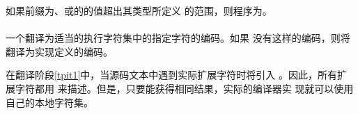 \begin{note} %
  如果前缀为、或的的值超出其类型所定义
  的范围，则程序为\illform{}。
\end{note}

\paragraph{} %
一个翻译为适当的执行字符集中的指定字符的编码。如果
没有这样的编码，则将翻译为实现定义的编码。

\begin{note} %
  在翻译阶段\ref{tpit1}中，当源码文本中遇到实际扩展字符时将引入
  。因此，所有扩展字符都用
  来描述。但是，只要能获得相同结果，实际的编译器实
  现就可以使用自己的本地字符集。
\end{note}
